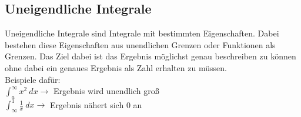 \subsection{Uneigendliche Integrale}
Uneigendliche Integrale sind Integrale mit bestimmten Eigenschaften. 
Dabei bestehen diese Eigenschaften aus unendlichen Grenzen oder Funktionen als Grenzen.
Das Ziel dabei ist das Ergebnis möglichst genau beschreiben zu können ohne dabei ein genaues Ergebnis als Zahl erhalten zu müssen. \\
Beispiele dafür: \\
$\int_{a}^{\infty} x^2\ dx \rightarrow$ Ergebnis wird unendlich groß \\
$\int_{\infty}^{1} \frac{1}{x}\ dx \rightarrow$ Ergebnis nähert sich 0 an \\
